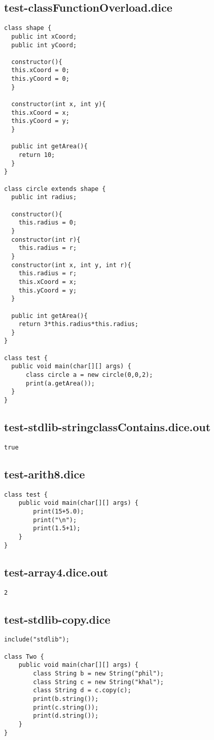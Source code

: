 \subsection{test-classFunctionOverload.dice}
\begin{verbatim}
class shape {
  public int xCoord;
  public int yCoord;

  constructor(){
  this.xCoord = 0;
  this.yCoord = 0;
  }

  constructor(int x, int y){
  this.xCoord = x;
  this.yCoord = y;
  }

  public int getArea(){
    return 10;
  }
}

class circle extends shape {
  public int radius;

  constructor(){
  	this.radius = 0;
  }
  constructor(int r){
  	this.radius = r;
  }
  constructor(int x, int y, int r){
  	this.radius = r;
  	this.xCoord = x;
  	this.yCoord = y;
  }

  public int getArea(){
    return 3*this.radius*this.radius;
  }
}

class test {
  public void main(char[][] args) {
      class circle a = new circle(0,0,2); 
      print(a.getArea());
  }
}
\end{verbatim}
\pagebreak
\subsection{test-stdlib-stringclassContains.dice.out}
\begin{verbatim}
true
\end{verbatim}
\pagebreak
\subsection{test-arith8.dice}
\begin{verbatim}
class test {
	public void main(char[][] args) {
		print(15+5.0);
		print("\n");
		print(1.5+1);
	}
}

\end{verbatim}
\pagebreak
\subsection{test-array4.dice.out}
\begin{verbatim}
2
\end{verbatim}
\pagebreak
\subsection{test-stdlib-copy.dice}
\begin{verbatim}
include("stdlib");

class Two {
	public void main(char[][] args) {
        class String b = new String("phil");
        class String c = new String("khal");
        class String d = c.copy(c);
        print(b.string());
        print(c.string());
        print(d.string());
	}
}
\end{verbatim}
\pagebreak
